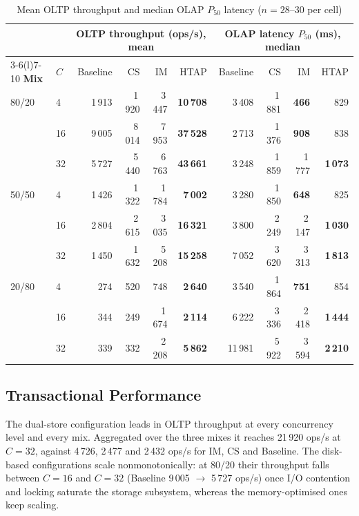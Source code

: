 \documentclass[10pt,conference,a4paper]{IEEEtran}
\newcommand{\best}[1]{\textbf{#1}}
\begin{document}
\begin{table}[t]
\caption{Mean OLTP throughput and median OLAP $P_{50}$ latency ($n = 28$--$30$ per cell)}
\label{tab:main}
\centering
\footnotesize
\begin{tabular}{@{}ll rrrr rrrr@{}}
\toprule
& & \multicolumn{4}{c}{\textbf{OLTP throughput (ops/s), mean}} & \multicolumn{4}{c}{\textbf{OLAP latency $P_{50}$ (ms), median}}\\
\cmidrule(lr){3-6}\cmidrule(l){7-10}
\textbf{Mix} & \textbf{$C$} & Baseline & CS & IM & HTAP & Baseline & CS & IM & HTAP\\
\midrule
80/20 & 4  & 1\,913 & 1\,920 & 3\,447 & \best{10\,708} & 3\,408 & 1\,881 & \best{466} & 829\\
      & 16 & 9\,005 & 8\,014 & 7\,953 & \best{37\,528} & 2\,713 & 1\,376 & \best{908} & 838\\
      & 32 & 5\,727 & 5\,440 & 6\,763 & \best{43\,661} & 3\,248 & 1\,859 & 1\,777 & \best{1\,073}\\
50/50 & 4  & 1\,426 & 1\,322 & 1\,784 & \best{7\,002}  & 3\,280 & 1\,850 & \best{648} & 825\\
      & 16 & 2\,804 & 2\,615 & 3\,035 & \best{16\,321} & 3\,800 & 2\,249 & 2\,147 & \best{1\,030}\\
      & 32 & 1\,450 & 1\,632 & 5\,208 & \best{15\,258} & 7\,052 & 3\,620 & 3\,313 & \best{1\,813}\\
20/80 & 4  & 274  & 520  & 748   & \best{2\,640}  & 3\,540 & 1\,864 & \best{751} & 854\\
      & 16 & 344  & 249  & 1\,674 & \best{2\,114} & 6\,222 & 3\,336 & 2\,418 & \best{1\,444}\\
      & 32 & 339  & 332  & 2\,208 & \best{5\,862} & 11\,981 & 5\,922 & 3\,594 & \best{2\,210}\\
\bottomrule
\end{tabular}
\end{table}

\subsection{Transactional Performance}
The dual-store configuration leads in OLTP throughput at every concurrency
level and every mix. Aggregated over the three mixes it reaches 21\,920
ops/s at $C = 32$, against 4\,726, 2\,477 and 2\,432 ops/s for IM, CS and
Baseline. The disk-based configurations scale nonmonotonically: at 80/20
their throughput falls between $C = 16$ and $C = 32$ (Baseline
9\,005 $\rightarrow$ 5\,727 ops/s) once I/O contention and locking saturate
the storage subsystem, whereas the memory-optimised ones keep scaling.
\end{document}
